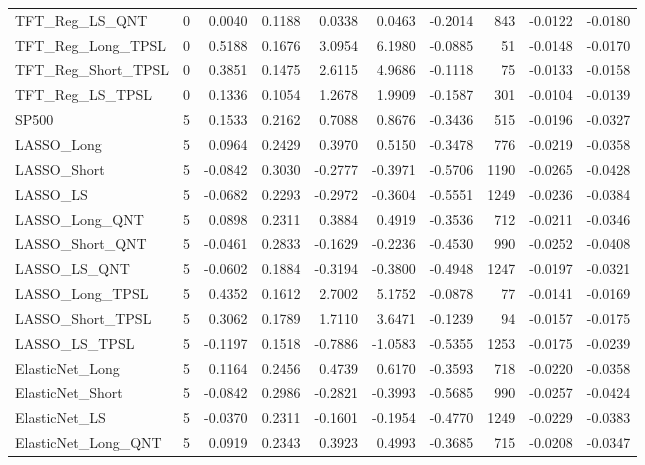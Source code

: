 \begin{tabular}{llrrrrrrrr}
\cline{1-10}
TFT\_Reg\_LS\_QNT & 0 & 0.0040 & 0.1188 & 0.0338 & 0.0463 & -0.2014 & 843 & -0.0122 & -0.0180 \\
\cline{1-10}
TFT\_Reg\_Long\_TPSL & 0 & 0.5188 & 0.1676 & 3.0954 & 6.1980 & -0.0885 & 51 & -0.0148 & -0.0170 \\
\cline{1-10}
TFT\_Reg\_Short\_TPSL & 0 & 0.3851 & 0.1475 & 2.6115 & 4.9686 & -0.1118 & 75 & -0.0133 & -0.0158 \\
\cline{1-10}
TFT\_Reg\_LS\_TPSL & 0 & 0.1336 & 0.1054 & 1.2678 & 1.9909 & -0.1587 & 301 & -0.0104 & -0.0139 \\
\cline{1-10}
SP500 & 5 & 0.1533 & 0.2162 & 0.7088 & 0.8676 & -0.3436 & 515 & -0.0196 & -0.0327 \\
\cline{1-10}
LASSO\_Long & 5 & 0.0964 & 0.2429 & 0.3970 & 0.5150 & -0.3478 & 776 & -0.0219 & -0.0358 \\
\cline{1-10}
LASSO\_Short & 5 & -0.0842 & 0.3030 & -0.2777 & -0.3971 & -0.5706 & 1190 & -0.0265 & -0.0428 \\
\cline{1-10}
LASSO\_LS & 5 & -0.0682 & 0.2293 & -0.2972 & -0.3604 & -0.5551 & 1249 & -0.0236 & -0.0384 \\
\cline{1-10}
LASSO\_Long\_QNT & 5 & 0.0898 & 0.2311 & 0.3884 & 0.4919 & -0.3536 & 712 & -0.0211 & -0.0346 \\
\cline{1-10}
LASSO\_Short\_QNT & 5 & -0.0461 & 0.2833 & -0.1629 & -0.2236 & -0.4530 & 990 & -0.0252 & -0.0408 \\
\cline{1-10}
LASSO\_LS\_QNT & 5 & -0.0602 & 0.1884 & -0.3194 & -0.3800 & -0.4948 & 1247 & -0.0197 & -0.0321 \\
\cline{1-10}
LASSO\_Long\_TPSL & 5 & 0.4352 & 0.1612 & 2.7002 & 5.1752 & -0.0878 & 77 & -0.0141 & -0.0169 \\
\cline{1-10}
LASSO\_Short\_TPSL & 5 & 0.3062 & 0.1789 & 1.7110 & 3.6471 & -0.1239 & 94 & -0.0157 & -0.0175 \\
\cline{1-10}
LASSO\_LS\_TPSL & 5 & -0.1197 & 0.1518 & -0.7886 & -1.0583 & -0.5355 & 1253 & -0.0175 & -0.0239 \\
\cline{1-10}
ElasticNet\_Long & 5 & 0.1164 & 0.2456 & 0.4739 & 0.6170 & -0.3593 & 718 & -0.0220 & -0.0358 \\
\cline{1-10}
ElasticNet\_Short & 5 & -0.0842 & 0.2986 & -0.2821 & -0.3993 & -0.5685 & 990 & -0.0257 & -0.0424 \\
\cline{1-10}
ElasticNet\_LS & 5 & -0.0370 & 0.2311 & -0.1601 & -0.1954 & -0.4770 & 1249 & -0.0229 & -0.0383 \\
\cline{1-10}
ElasticNet\_Long\_QNT & 5 & 0.0919 & 0.2343 & 0.3923 & 0.4993 & -0.3685 & 715 & -0.0208 & -0.0347 \\

\end{tabular}
